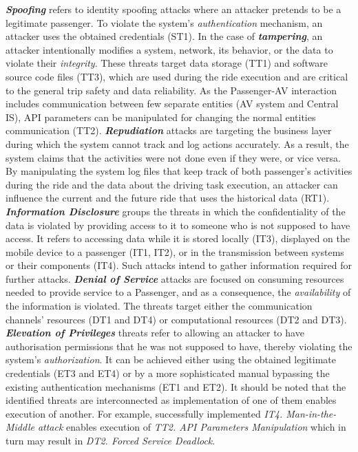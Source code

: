 \documentclass[manuscript]{acmart}
\begin{document}
\textit{\textbf{Spoofing}} refers to identity spoofing attacks where an attacker pretends to be a legitimate passenger. To violate the system's \textit{authentication} mechanism, an attacker uses the obtained credentials (ST1). In the case of \textit{\textbf{tampering}}, an attacker intentionally modifies a system, network, its behavior, or the data to violate their \textit{integrity}. These threats target data storage (TT1) and software source code files (TT3), which are used during the ride execution and are critical to the general trip safety and data reliability. As the Passenger-AV interaction includes communication between few separate entities (AV system and Central IS), API parameters can be manipulated for changing the normal entities communication (TT2). \textit{\textbf{Repudiation}} attacks are targeting the business layer during which the system cannot track and log actions accurately. As a result, the system claims that the activities were not done even if they were, or vice versa. By manipulating the system log files that keep track of both passenger's activities during the ride and the data about the driving task execution, an attacker can influence the current and the future ride that uses the historical data (RT1). \textit{\textbf{Information Disclosure}} groups the threats in which the confidentiality of the data is violated by providing access to it to someone who is not supposed to have access. It refers to accessing data while it is stored locally (IT3), displayed on the mobile device to a passenger (IT1, IT2), or in the transmission between systems or their components (IT4). Such attacks intend to gather information required for further attacks. \textit{\textbf{Denial of Service}} attacks are focused on consuming resources needed to provide service to a Passenger, and as a consequence, the \textit{availability} of the information is violated. The threats target either the communication channels' resources (DT1 and DT4) or computational resources (DT2 and DT3). \textit{\textbf{Elevation of Privileges}} threats refer to allowing an attacker to have authorisation permissions that he was not supposed to have, thereby violating the system's \textit{authorization}. It can be achieved either using the obtained legitimate credentials (ET3 and ET4) or by a more sophisticated manual bypassing the existing authentication mechanisms (ET1 and ET2). It should be noted that the identified threats are interconnected as implementation of one of them  enables execution of another. For example, successfully implemented\textit{ IT4. Man-in-the-Middle attack} enables execution of \textit{TT2. API Parameters Manipulation} which in turn may result in \textit{DT2. Forced Service Deadlock}.
\end{document}
